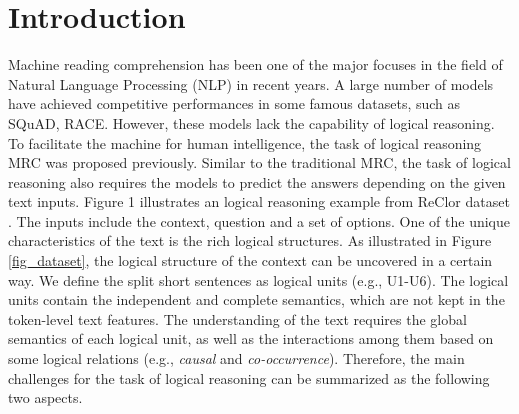 \documentclass[sigconf]{acmart}
\begin{document}


\maketitle

\section{Introduction}
\noindent Machine reading comprehension \cite{liu2019neural, zhang2019machine, 
hirschman2001natural} has been one of the major focuses in the field of Natural 
Language Processing (NLP) \cite{chowdhury2003natural, hirschberg2015advances} 
in recent years. A large number of models have achieved competitive 
performances in some famous datasets, such as SQuAD\cite{rajpurkar2016squad, 
rajpurkar2018know}, RACE\cite{lai2017race}. However, these models 
\cite{seo2016bidirectional, dhingra2016gated, yu2018qanet} lack the capability 
of logical reasoning. To facilitate the machine for human intelligence, the 
task of logical reasoning MRC \cite{yu2019reclor,liu2020logiqa} was proposed 
previously. Similar to the traditional MRC, the task of logical reasoning also 
requires the models to predict the answers depending on the given text inputs. 
Figure 1 illustrates an logical reasoning example from ReClor dataset 
\cite{yu2019reclor}. The inputs include the context, question and a set of 
options. One of the unique characteristics of the text is the rich logical 
structures. As illustrated in Figure \ref{fig_dataset}, the logical structure 
of the context can be uncovered in a certain way. We define the split short 
sentences as logical units (e.g., U1-U6). The logical units contain the 
independent and complete semantics, which are not kept in the token-level text 
features. The understanding of the text requires the global semantics of each 
logical unit, as well as the interactions among them based on some logical 
relations (e.g., \textit{causal} and \textit{co-occurrence}). Therefore, the 
main challenges for the task of logical reasoning can be summarized as the 
following two aspects.
\end{document}

